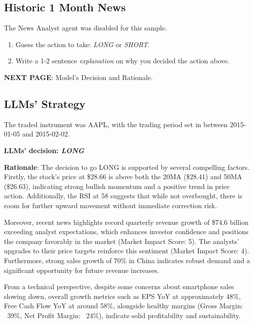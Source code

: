 \documentclass[8pt]{scrartcl}
\begin{document}
\subsection*{Historic 1 Month News}

The News Analyst agent was disabled for this sample.

\begin{tcolorbox}[colback=blue!10, colframe=blue!60, title=\textbf{TASKS}, sharp corners=southwest]
\begin{enumerate}
    \item Guess the action to take: \textit{LONG} or \textit{SHORT}.
    \item Write a 1-2 sentence \textit{explanation} on why you decided the action above.
\end{enumerate}
\end{tcolorbox}

\textbf{NEXT PAGE}: Model's Decision and Rationale.

\newpage

\subsection*{LLMs' Strategy} \label{strategy6}

The traded instrument was AAPL, with the trading period set in between 2015-01-05 and 2015-02-02.

\textbf{LLMs' decision: \textit{LONG}}

\textbf{Rationale}: The decision to go LONG is supported by several compelling factors. Firstly, the stock's price at \$28.66 is above both the 20MA (\$28.41) and 50MA (\$26.63), indicating strong bullish momentum and a positive trend in price action. Additionally, the RSI at 58 suggests that while not overbought, there is room for further upward movement without immediate correction risk.

Moreover, recent news highlights record quarterly revenue growth of \$74.6 billion exceeding analyst expectations, which enhances investor confidence and positions the company favorably in the market (Market Impact Score: 5). The analysts' upgrades to their price targets reinforce this sentiment (Market Impact Score: 4). Furthermore, strong sales growth of 70\% in China indicates robust demand and a significant opportunity for future revenue increases.

From a technical perspective, despite some concerns about smartphone sales slowing down, overall growth metrics such as EPS YoY at approximately 48\%, Free Cash Flow YoY at around 58\%, alongside healthy margins (Gross Margin: ~39\%, Net Profit Margin: ~24\%), indicate solid profitability and sustainability.
\end{document}
